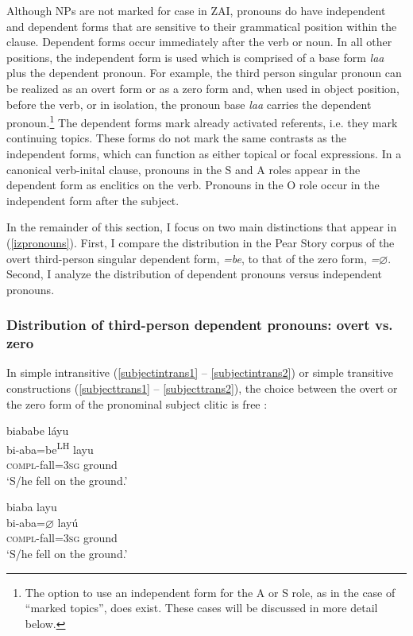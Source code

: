 Although NPs are not marked for case in ZAI, pronouns do have independent and dependent forms that are sensitive to their grammatical position within the clause. Dependent forms occur immediately after the verb or noun. In all other positions, the independent form is used which is comprised of a base form \textit{laa} plus the dependent pronoun. For example, the third person singular pronoun can be realized as an overt form or as a zero form and, when used in object position, before the verb, or in isolation, the pronoun base \textit{laa} carries the dependent pronoun.\footnote{The option to use an independent form for the A or S role, as in the case of ``marked topics'', does exist. These cases will be discussed in more detail below.} The dependent forms mark already activated referents, i.e. they mark continuing topics. These forms do not mark the same contrasts as the independent forms, which can function as either topical or focal expressions. In a canonical verb-inital clause, pronouns in the S and A roles appear in the dependent form as enclitics on the verb. Pronouns in the O role occur in the independent form after the subject.

In the remainder of this section, I focus on two main distinctions that appear  in (\ref{izpronouns}). First, I compare the distribution in the Pear Story corpus of the overt third-person singular dependent form, \textit{=be}, to that of the zero form, \textit{=$\varnothing$}. Second, I analyze the distribution of dependent pronouns versus independent pronouns. 


\subsubsection{Distribution of third-person dependent pronouns: overt vs. zero}

In simple intransitive (\ref{subjectintrans1} -- \ref{subjectintrans2}) or simple transitive constructions (\ref{subjecttrans1} -- \ref{subjecttrans2}), the choice between the overt or the zero form of the pronominal subject clitic is free \citep{marlett1996}:

\ea\label{subjectintrans1}
\glll biababe l\'{a}yu \\
bi-aba=be\textsuperscript{LH} layu \\
\textsc{compl}-fall=3\textsc{sg} ground \\
\glt `S/he fell on the ground.'
\z

\ea\label{subjectintrans2}
\glll biaba layu \\
bi-aba=$\varnothing$ lay\'{u} \\
\textsc{compl}-fall=3\textsc{sg} ground \\
\glt `S/he fell on the ground.'
\z

